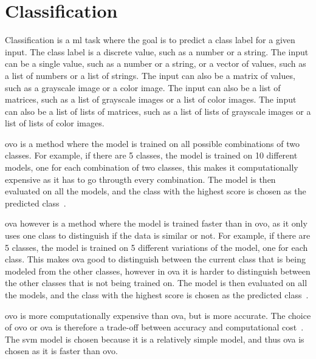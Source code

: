 \section{Classification}\label{sec:classification}
Classification is a \gls{ml} task where the goal is to predict a class label for a given input. The class label is a discrete value, such as a number or a string. The input can be a single value, such as a number or a string, or a vector of values, such as a list of numbers or a list of strings. The input can also be a matrix of values, such as a grayscale image or a color image. The input can also be a list of matrices, such as a list of grayscale images or a list of color images. The input can also be a list of lists of matrices, such as a list of lists of grayscale images or a list of lists of color images.





\gls{ovo} is a method where the model is trained on all possible combinations of two classes. For example, if there are 5 classes, the model is trained on 10 different models, one for each combination of two classes, this makes it computationally expensive as it has to go througth every combination. The model is then evaluated on all the models, and the class with the highest score is chosen as the predicted class~\cite{james-statistical-learning}.

\gls{ova} however is a method where the model is trained faster than in \gls{ovo}, as it only uses one class to distinguish if the data is similar or not. For example, if there are 5 classes, the model is trained on 5 different variations of the model, one for each class. This makes \gls{ova} good to distinguish between the current class that is being modeled from the other classes, however in \gls{ova} it is harder to distinguish between the other classes that is not being trained on. The model is then evaluated on all the models, and the class with the highest score is chosen as the predicted class~\cite{james-statistical-learning}.

\gls{ovo} is more computationally expensive than \gls{ova}, but is more accurate. The choice of \gls{ovo} or \gls{ova} is therefore a trade-off between accuracy and computational cost~\cite{james-statistical-learning}. The \gls{svm} model is chosen because it is a relatively simple model, and thus \gls{ova} is chosen as it is faster than \gls{ovo}.


